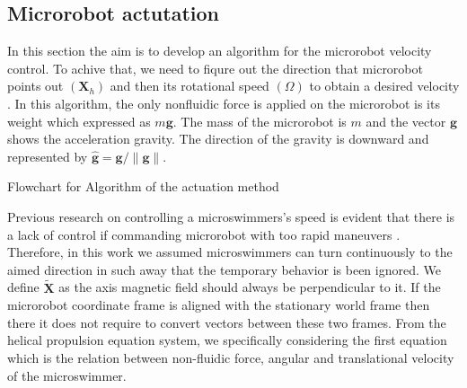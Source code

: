 \documentclass[12pt,a4paper,titlepage]{report}
\begin{document}
\subsection{Microrobot actutation}\label{microActuation}





In this section the aim is to develop an algorithm for the microrobot velocity control. To achive that, we need to 
fiqure out the direction that microrobot points out $(\bm{X}_{h})$ and then its rotational speed $(\Omega)$
 to obtain a desired velocity \cite{mahoney2011velocity}.
In this algorithm, the only nonfluidic force is applied on the microrobot is its weight which expressed as 
$m\bm{g}$. The mass of the microrobot is $m$ and the vector $\bm{g}$ shows the acceleration gravity. 
The direction of the gravity is downward and represented by $\hat{ \bm{g} }= \bm{g}/ \| \bm{g}\|$.






Flowchart for Algorithm of the actuation method


Previous research on controlling a microswimmers\rq{}s speed is evident that there is a lack
of control if commanding microrobot with too rapid maneuvers \citep{zhang2009characterizing} \citep{zhang2009artificial}
. Therefore, in this work we assumed
microswimmers can turn continuously to the aimed direction in such away that the temporary behavior is been
ignored. We define $\tilde{\bm{X}}$ as the axis magnetic field should always be perpendicular to it.
If the microrobot coordinate frame is aligned with the stationary world frame then there it does not require
to convert vectors between these two frames. From the helical propulsion equation system, 
we specifically considering the first equation which is the relation between non-fluidic force, angular and 
translational velocity of the microswimmer. 
\end{document}
